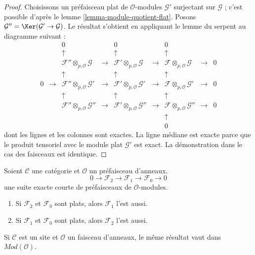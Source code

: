 \begin{proof}
Choisissons un préfaisceau plat de $\mathcal{O}$-modules $\mathcal{G}'$
surjectant sur $\mathcal{G}$ ; c'est possible d'après le lemme
\ref{lemma-module-quotient-flat}. Posons
$\mathcal{G}'' = \Ker(\mathcal{G}' \to \mathcal{G})$. Le résultat s'obtient
en appliquant le lemme du serpent au diagramme suivant :
$$
\begin{matrix}
 & & 0 & & 0 & & 0 & & \\
 & & \uparrow & & \uparrow & & \uparrow & & \\
 & & \mathcal{F}'' \otimes_{p, \mathcal{O}} \mathcal{G} & \to &
     \mathcal{F}' \otimes_{p, \mathcal{O}} \mathcal{G} & \to &
     \mathcal{F} \otimes_{p, \mathcal{O}} \mathcal{G} & \to & 0 \\
 & & \uparrow & & \uparrow & & \uparrow & & \\
0 & \to & \mathcal{F}'' \otimes_{p, \mathcal{O}} \mathcal{G}' & \to &
          \mathcal{F}' \otimes_{p, \mathcal{O}} \mathcal{G}' & \to &
          \mathcal{F} \otimes_{p, \mathcal{O}} \mathcal{G}' & \to & 0 \\
 & & \uparrow & & \uparrow & & \uparrow & & \\
 & & \mathcal{F}'' \otimes_{p, \mathcal{O}} \mathcal{G}'' & \to &
     \mathcal{F}' \otimes_{p, \mathcal{O}} \mathcal{G}'' & \to &
     \mathcal{F} \otimes_{p, \mathcal{O}} \mathcal{G}'' & \to & 0 \\
 & & & & & & \uparrow & & \\
 & & & & & & 0 & &
\end{matrix}
$$
dont les lignes et les colonnes sont exactes. La ligne médiane est exacte
parce que le produit tensoriel avec le module plat $\mathcal{G}'$ est exact.
La démonstration dans le cas des faisceaux est identique.
\end{proof}

\begin{lemma}

\label{lemma-flat-ses}

Soient $\mathcal{C}$ une catégorie et $\mathcal{O}$ un préfaisceau d'anneaux.
$$
0 \to
\mathcal{F}_2 \to
\mathcal{F}_1 \to
\mathcal{F}_0 \to 0
$$
une suite exacte courte de préfaisceaux de $\mathcal{O}$-modules.

\begin{enumerate}

\item Si $\mathcal{F}_2$ et $\mathcal{F}_0$ sont plats, alors
$\mathcal{F}_1$ l'est aussi.
\item Si $\mathcal{F}_1$ et $\mathcal{F}_0$ sont plats, alors
$\mathcal{F}_2$ l'est aussi.

\end{enumerate}

Si $\mathcal{C}$ est un site et $\mathcal{O}$ un faisceau d'anneaux, le même
résultat vaut dans $\textit{Mod}(\mathcal{O})$.

\end{lemma}

